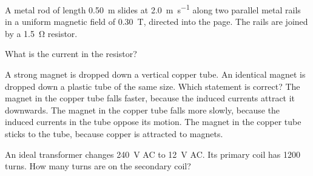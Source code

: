 \begin{quizq}{}
A metal rod of length \qty{0.50}{m} slides at \qty{2.0}{m.s^{-1}} along two parallel metal rails in a
uniform magnetic field of \qty{0.30}{T}, directed into the page. The rails are joined by a
\qty{1.5}{\ohm} resistor.
\begin{center}
\end{center}
What is the current in the resistor?
\end{quizq}

\begin{quizq}{}
A strong magnet is dropped down a vertical copper tube. An identical magnet is dropped down a plastic
tube of the same size. Which statement is correct?
  {The magnet in the copper tube falls faster, because the induced currents attract it downwards.}
  {The magnet in the copper tube falls more slowly, because the induced currents in the tube oppose its
  motion.}
  {The magnet in the copper tube sticks to the tube, because copper is attracted to magnets.}
\end{quizq}

\begin{quizq}{}
An ideal transformer changes \qty{240}{V} AC to \qty{12}{V} AC. Its primary coil has 1200 turns. How many
turns are on the secondary coil?
\end{quizq}


